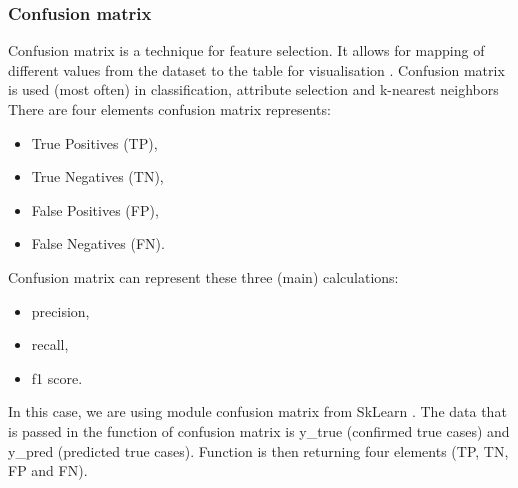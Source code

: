\subsubsection{Confusion matrix}
Confusion matrix is a technique for feature selection. It allows for mapping of different values from the dataset to the table for visualisation \parencite{web:PrecisionAndRecallInPython}. Confusion matrix is used (most often) in classification, attribute selection and k-nearest neighbors \parencite{visa2011confusion}
\newline
There are four elements confusion matrix represents:
\begin{itemize}
  \item True Positives (TP), 
  \item True Negatives (TN),  
  \item False Positives (FP), 
  \item False Negatives (FN).
\end{itemize}
Confusion matrix can represent these three (main) calculations:
\begin{itemize}
  \item precision,
  \item recall,
  \item f1 score.
\end{itemize}

In this case, we are using module confusion matrix from SkLearn \parencite{web:ConfusionMatrix}. The data that is passed in the function of confusion matrix is y{\_}true (confirmed true cases) and y{\_}pred (predicted true cases). Function is then returning four elements (TP, TN, FP and FN).